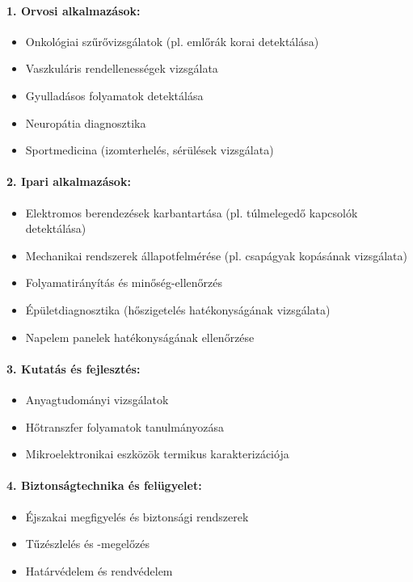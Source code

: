 \documentclass[a4paper,12pt]{article}
\begin{document}
\paragraph{1. Orvosi alkalmazások:} \begin{itemize} \item Onkológiai szűrővizsgálatok (pl. emlőrák korai detektálása) \item Vaszkuláris rendellenességek vizsgálata \item Gyulladásos folyamatok detektálása \item Neuropátia diagnosztika \item Sportmedicina (izomterhelés, sérülések vizsgálata) \end{itemize}

\paragraph{2. Ipari alkalmazások:} \begin{itemize} \item Elektromos berendezések karbantartása (pl. túlmelegedő kapcsolók detektálása) \item Mechanikai rendszerek állapotfelmérése (pl. csapágyak kopásának vizsgálata) \item Folyamatirányítás és minőség-ellenőrzés \item Épületdiagnosztika (hőszigetelés hatékonyságának vizsgálata) \item Napelem panelek hatékonyságának ellenőrzése \end{itemize}

\paragraph{3. Kutatás és fejlesztés:} \begin{itemize} \item Anyagtudományi vizsgálatok \item Hőtranszfer folyamatok tanulmányozása \item Mikroelektronikai eszközök termikus karakterizációja \end{itemize}

\paragraph{4. Biztonságtechnika és felügyelet:} \begin{itemize} \item Éjszakai megfigyelés és biztonsági rendszerek \item Tűzészlelés és -megelőzés \item Határvédelem és rendvédelem \end{itemize}
\end{document}
